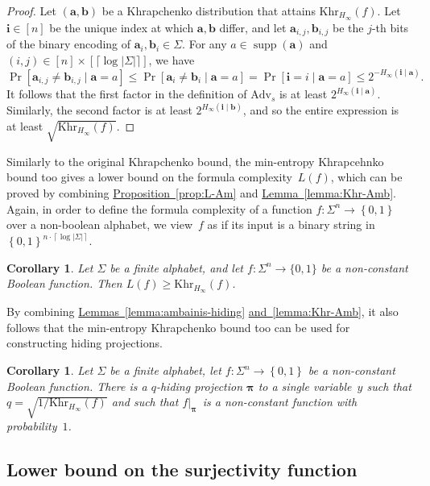 \documentclass[11pt]{article}
\numberwithin{equation}{section}
\newtheorem{corollary}[theorem]{Corollary}
\theoremstyle{definition}
\theoremstyle{plain}
\newcommand{\expref}[2]{\hyperref[#2]{#1~\ref{#2}}}
\theoremstyle{definition}\newtheorem{notation}[theorem]{Notation}\theoremstyle{plain}
\newcommand{\B}{\left\{ 0,1 \right \}}
\newcommand{\p}{\boldsymbol{\pi}}
\renewcommand{\a}{\boldsymbol{a}}
\renewcommand{\b}{\boldsymbol{b}}
\renewcommand{\i}{\boldsymbol{i}}
\newcommand{\Hm}{H_{\infty}}
\newcommand{\K}{\mathrm{Khr}}
\newcommand{\Km}{\K_{\Hm}}
\newcommand{\Am}{\mathrm{Adv}_{s}}
\DeclareMathOperator{\supp}{supp}
\theoremstyle{definition}
\theoremstyle{plain}
\begin{document}
\begin{proof}
Let $(\a,\b)$ be a Khrapchenko distribution that attains $\Km(f)$.
Let $\i\in[n]$ be the unique index at which $\a,\b$ differ, and
let $\a_{i,j},\b_{i,j}$ be the $j$-th bits of the binary encoding
of $\a_{i},\b_{i}\in\Sigma$. For any $a\in\supp(\a)$ and $(i,j)\in[n]\times[\lceil\log|\Sigma|\rceil]$,
we have 
\[
\Pr[\a_{i,j}\neq\b_{i,j}\mid\a=a]\leq\Pr[\a_{i}\neq\b_{i}\mid\a=a]=\Pr[\i=i\mid\a=a]\leq2^{-\Hm(\i\mid\a)}.
\]
It follows that the first factor in the definition of $\Am$ is at
least $2^{\Hm(\i\mid\a)}$. Similarly, the second factor is at least
$2^{\Hm(\i\mid\b)}$, and so the entire expression is at least $\sqrt{\Km(f)}$. 
\end{proof}
Similarly to the original Khrapchenko bound, the min-entropy Khrapcehnko
bound too gives a lower bound on the formula complexity~$L(f)$,
which can be proved by combining \expref{Proposition}{prop:L-Am} 
and \expref{Lemma}{lemma:Khr-Amb}. Again,
in order to define the formula complexity of a function $f\colon\Sigma^{n}\to\B$
over a non-boolean alphabet, we view~$f$ as if its input is a binary
string in~$\B^{n\cdot\left\lceil \log\left|\Sigma\right|\right\rceil }$. 
\begin{corollary}
\label{cor:min-entropy-khrapchenko-lower-bound}Let $\Sigma$ be a finite
alphabet, and let $f\colon\Sigma^{n}\to\{0,1\}$ be a non-constant
Boolean function. Then $L(f)\geq\Km(f)$. 
\end{corollary}

\noindent By combining \expref{Lemmas}{lemma:ambainis-hiding}
\expref{and}{lemma:Khr-Amb}, it also follows
that the min-entropy Khrapchenko bound too can be used for constructing
hiding projections.
\begin{corollary}
\label{cor:min-khrapchenko-hiding}Let $\Sigma$ be a finite alphabet,
let $f\colon\Sigma^{n}\to\B$ be a non-constant Boolean function.
There is a $q$-hiding projection $\p$ to a single variable~$y$
such that $q=\sqrt{1/\Km(f)}$ and such that $f|_{\p}$~is a non-constant
function with probability~$1$.
\end{corollary}


%
\subsection{Lower bound on the surjectivity function}  %
\end{document}
